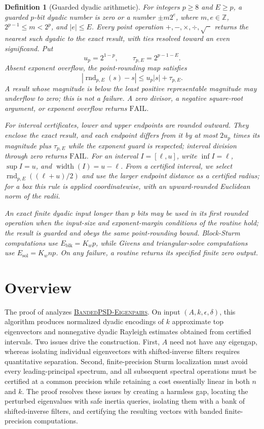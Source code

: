 \documentclass[11pt]{article}
\newtheorem{definition}[lemma]{Definition}
\newcommand{\BandedPSDEigenpairs}{%
  \textnormal{\textsc{BandedPSD-\hspace{0pt}Eigenpairs}}}
\begin{document}
\begin{definition}[Guarded dyadic arithmetic]
\label{def:guarded-dyadic-arithmetic}
For integers $p\geq8$ and $E\geq p$, a guarded $p$-bit dyadic number is zero
or a number $\pm m2^e$, where $m,e\in\mathbb Z$,
$2^{p-1}\leq m<2^p$, and $|e|\leq E$.
Every point operation $+,-,\times,\div,\sqrt{\phantom{x}}$ returns the
nearest such dyadic to the exact result, with ties resolved toward an even
significand.  Put
\[
 u_p=2^{1-p},\qquad \tau_{p,E}=2^{p-1-E}.
\]
Absent exponent overflow, the point-rounding map satisfies
\[
 |\operatorname{rnd}_{p,E}(s)-s|
 \leq u_p|s|+\tau_{p,E}.
\]
A result whose magnitude is below the least positive representable magnitude
may underflow to zero; this is not a failure.  A zero divisor, a negative
square-root argument, or exponent overflow returns $\mathrm{FAIL}$.

For interval certificates, lower and upper endpoints are rounded outward.
They enclose the exact result, and each endpoint differs from it by at most
$2u_p$ times its magnitude plus $\tau_{p,E}$ while the exponent guard is
respected; interval division through zero returns $\mathrm{FAIL}$.  For an
interval $I=[\ell,u]$, write $\inf I=\ell$, $\sup I=u$, and
$\operatorname{width}(I)=u-\ell$.  From a certified interval, we select
$\operatorname{rnd}_{p,E}((\ell+u)/2)$ and use the larger endpoint distance
as a certified radius; for a box this rule is applied coordinatewise, with an
upward-rounded Euclidean norm of the radii.

An exact finite dyadic input longer than $p$ bits may be used in its first
rounded operation when the input-size and exponent-margin conditions of the
routine hold; the result is guarded and obeys the same point-rounding bound.
Block-Sturm computations use
$E_{\mathrm{blk}}=K_wp$, while Givens and triangular-solve computations use
$E_{\mathrm{sol}}=K_wnp$.  On any failure, a routine returns its specified
finite zero output.
\end{definition}

\section{Overview}
\label{sec:overview}

The proof of  analyzes
\hyperref[alg:main]{\BandedPSDEigenpairs}.  On input
$(A,k,\epsilon,\delta)$, this algorithm produces normalized dyadic encodings
of $k$ approximate top eigenvectors and nonnegative dyadic Rayleigh estimates
obtained from certified intervals.  Two issues drive the construction.
First, $A$ need not have any eigengap, whereas isolating individual
eigenvectors with shifted-inverse filters requires quantitative separation.
Second, finite-precision Sturm localization must avoid every
leading-principal spectrum, and all subsequent spectral operations must be
certified at a common precision while retaining a cost essentially linear in
both $n$ and $k$.  The proof resolves these issues by creating a harmless gap,
locating the perturbed eigenvalues with safe inertia queries, isolating them
with a bank of shifted-inverse filters, and certifying the resulting vectors
with banded finite-precision computations.
\end{document}
